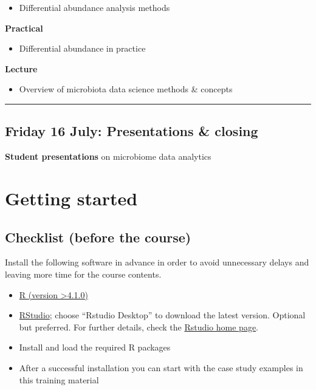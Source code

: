 \documentclass[
  oneside]{book}
\providecommand{\tightlist}{%
  \setlength{\itemsep}{0pt}\setlength{\parskip}{0pt}}
\begin{document}
\begin{itemize}
\tightlist
\item
  Differential abundance analysis methods
\end{itemize}

\textbf{Practical}

\begin{itemize}
\tightlist
\item
  Differential abundance in practice
\end{itemize}

\textbf{Lecture}

\begin{itemize}
\tightlist
\item
  Overview of microbiota data science methods \& concepts
\end{itemize}

\begin{center}\rule{0.5\linewidth}{0.5pt}\end{center}

\hypertarget{friday-16-july-presentations-closing}{%
\section{Friday 16 July: Presentations \& closing}\label{friday-16-july-presentations-closing}}

\textbf{Student presentations} on microbiome data analytics

\hypertarget{getting-started}{%
\chapter{Getting started}\label{getting-started}}

\hypertarget{checklist-before-the-course}{%
\section{Checklist (before the course)}\label{checklist-before-the-course}}

Install the following software in advance in order to avoid
unnecessary delays and leaving more time for the course contents.

\begin{itemize}
\item
  \href{https://www.r-project.org/}{R (version \textgreater4.1.0)}
\item
  \href{https://www.rstudio.com/products/rstudio/download/}{RStudio};
  choose ``Rstudio Desktop'' to download the latest version. Optional
  but preferred. For further details, check the \href{https://www.rstudio.com/}{Rstudio home
  page}.
\item
  Install and load the required R packages
\item
  After a successful installation you can start with the
  case study examples in this training material
\end{itemize}
\end{document}
